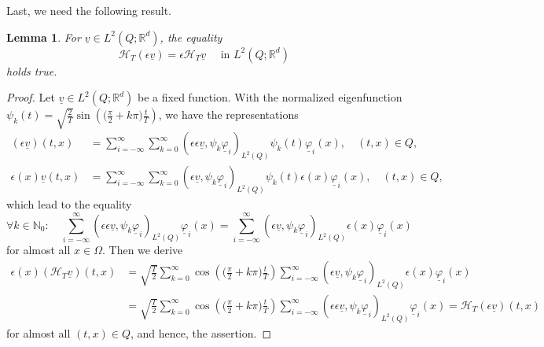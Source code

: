 \documentclass[a4paper,11pt]{article}
\newtheorem{lemma}[theorem]{Lemma}
\newcommand{\N}{\mathbb N}
\newcommand{\R}{\mathbb R}
\renewcommand{\vec}[1]{\underline{#1}}
\begin{document}
Last, we need the following result.
\begin{lemma} \label{VF:lem:Vertauschen}
	For $\vec v \in L^2(Q;\R^d)$, the equality
	\begin{equation*}
		\mathcal H_T (\epsilon \vec v) = \epsilon \mathcal H_T \vec v \quad \text{ in }L^2(Q;\R^d) 
	\end{equation*}
	holds true.
\end{lemma}
\begin{proof}
	Let $\vec v \in L^2(Q;\R^d)$ be a fixed function. With the normalized eigenfunction $\psi_k(t) = \sqrt{\frac{2}{T}} \sin \left( \Big( \frac{\pi}{2} + k\pi \Big) \frac{t}{T} \right)$, we have the representations
	\begin{align*}
		(\epsilon\vec v)(t,x) &= \sum_{i=-\infty}^\infty \sum_{k=0}^\infty (\epsilon \epsilon \vec v, \psi_k   \vec \varphi_i)_{L^2(Q)} \psi_k(t) \vec \varphi_i(x), \quad (t,x) \in Q, \\
		\epsilon(x) \vec v(t,x) &= \sum_{i=-\infty}^\infty \sum_{k=0}^\infty (\epsilon \vec v, \psi_k   \vec \varphi_i)_{L^2(Q)} \psi_k(t) \epsilon(x) \vec \varphi_i(x), \quad (t,x) \in Q,
	\end{align*}
	which lead to the equality
	\begin{equation*}
		\forall k \in \N_0: \quad \sum_{i=-\infty}^\infty  (\epsilon \epsilon \vec v, \psi_k   \vec \varphi_i)_{L^2(Q)} \vec \varphi_i(x) = \sum_{i=-\infty}^\infty (\epsilon \vec v, \psi_k   \vec \varphi_i)_{L^2(Q)} \epsilon(x) \vec \varphi_i(x)
	\end{equation*}
	for almost all $x \in \Omega$. Then we derive
	\begin{align*}
		\epsilon(x) ({\mathcal{H}}_T \vec v)(t,x) &= \sqrt{\frac{T}{2}}  \sum_{k=0}^\infty \cos \left( \Big( \frac{\pi}{2} + k\pi \Big) \frac{t}{T} \right) \sum_{i=-\infty}^\infty(\epsilon \vec v, \psi_k   \vec \varphi_i)_{L^2(Q)}  \epsilon(x) \vec \varphi_i(x) \\
		&= \sqrt{\frac{T}{2}}  \sum_{k=0}^\infty \cos \left( \Big( \frac{\pi}{2} + k\pi \Big) \frac{t}{T} \right) \sum_{i=-\infty}^\infty  (\epsilon \epsilon \vec v, \psi_k   \vec \varphi_i)_{L^2(Q)} \vec \varphi_i(x)  = \mathcal H_T ( \epsilon \vec v) (t,x)
	\end{align*}
	for almost all $(t,x) \in Q$, and hence, the assertion.
\end{proof}
\end{document}
